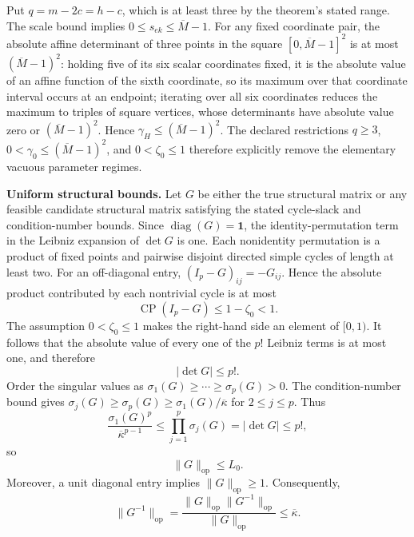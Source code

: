 Put \(q=m-2c=h-c\), which is at least three by the theorem's stated range. The scale bound implies \(0\leq s_{ek}\leq\overline M-1\). For any fixed coordinate pair, the absolute affine determinant of three points in the square \([0,\overline M-1]^2\) is at most \((\overline M-1)^2\): holding five of its six scalar coordinates fixed, it is the absolute value of an affine function of the sixth coordinate, so its maximum over that coordinate interval occurs at an endpoint; iterating over all six coordinates reduces the maximum to triples of square vertices, whose determinants have absolute value zero or \((\overline M-1)^2\). Hence \(\gamma_H\leq(\overline M-1)^2\). The declared restrictions \(q\geq3\), \(0<\gamma_0\leq(\overline M-1)^2\), and \(0<\zeta_0\leq1\) therefore explicitly remove the elementary vacuous parameter regimes.

\textbf{Uniform structural bounds.}
Let \(G\) be either the true structural matrix or any feasible candidate structural matrix satisfying the stated cycle-slack and condition-number bounds. Since \(\operatorname{diag}(G)=\mathbf 1\), the identity-permutation term in the Leibniz expansion of \(\det G\) is one. Each nonidentity permutation is a product of fixed points and pairwise disjoint directed simple cycles of length at least two. For an off-diagonal entry, \((I_p-G)_{ij}=-G_{ij}\). Hence the absolute product contributed by each nontrivial cycle is at most
\[
\operatorname{CP}(I_p-G)\leq1-\zeta_0<1.
\]
The assumption \(0<\zeta_0\leq1\) makes the right-hand side an element of \([0,1)\). It follows that the absolute value of every one of the \(p!\) Leibniz terms is at most one, and therefore
\[
|\det G|\leq p!.
\tag{1}
\]
Order the singular values as \(\sigma_1(G)\geq\cdots\geq\sigma_p(G)>0\). The condition-number bound gives \(\sigma_j(G)\geq\sigma_p(G)\geq\sigma_1(G)/\overline\kappa\) for \(2\leq j\leq p\). Thus
\[
\frac{\sigma_1(G)^p}{\overline\kappa^{p-1}}
\leq\prod_{j=1}^p\sigma_j(G)
=|\det G|
\leq p!,
\]
so
\[
\|G\|_{\mathrm{op}}\leq L_0.
\tag{2}
\]
Moreover, a unit diagonal entry implies \(\|G\|_{\mathrm{op}}\geq1\). Consequently,
\[
\|G^{-1}\|_{\mathrm{op}}
=\frac{\|G\|_{\mathrm{op}}\|G^{-1}\|_{\mathrm{op}}}
{\|G\|_{\mathrm{op}}}
\leq\overline\kappa.
\tag{3}
\]

